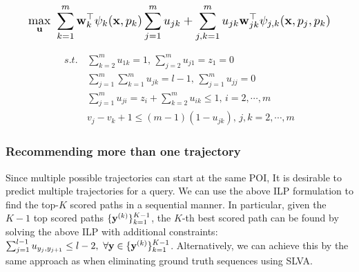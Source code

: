 \vspace{-.4em}
\begin{equation}
\label{eq:obj}
\resizebox{0.909\linewidth}{!}{$\displaystyle
\max_{\bu} ~\sum_{k=1}^m \w_k^\top \psi_k(\x, p_k) \sum_{j=1}^m u_{jk} +
            \sum_{j,k=1}^m u_{jk} \w_{jk}^\top \psi_{j, k}(\x, p_j, p_k)
$}
\end{equation}
%
\begin{small}
\vspace{-1.2em}
\begin{align}
s.t. \, 
& \sum_{k=2}^m u_{1k} = 1, \, \sum_{j=2}^m u_{j1} = z_1=0                   \label{eq:cons1} \\
& \sum_{j=1}^m \sum_{k=1}^m u_{jk} = l-1, \, \sum_{j=1}^m u_{jj}=0          \label{eq:cons2} \\
& \sum_{j=1}^m u_{ji} = z_i + \sum_{k=2}^m u_{ik} \le 1, \, i = 2,\cdots,m  \label{eq:cons3} \\
& v_j - v_k + 1 \le (m-1) (1-u_{jk}), \, j,k = 2,\cdots,m                   \label{eq:cons4}
\end{align}
\end{small}

\vspace{-1.3em}

\subsubsection{Recommending more than one trajectory}
Since multiple possible trajectories can start at the same POI, 
It is desirable %
to predict multiple trajectories for a query. %
We can use the above ILP formulation to find the top-$K$ scored paths in a sequential manner.
In particular, given the $K\!-\!1$ top scored paths $\{\mathbf{y}^{({k})}\}_{k=1}^{K-1}$,
the $K\!$-th best scored path can be found by solving the above ILP with additional constraints:
$\sum_{j=1}^{l-1} u_{y_j, y_{j+1}} \le l-2, ~\forall \mathbf{y} \in \{\mathbf{y}^{(k)}\}_{k=1}^{K-1}$.
Alternatively, we can achieve this by %
the same approach as when eliminating ground truth sequences using SLVA.


